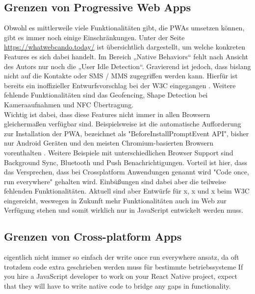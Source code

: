 \subsection{Grenzen von Progressive Web Apps}
Obwohl es mittlerweile viele Funktionalitäten gibt, die PWAs umsetzen können, gibt es immer noch einige Einschränkungen. Unter der Seite \url{https://whatwebcando.today/} ist übersichtlich dargestellt, um welche konkreten Features es sich dabei handelt. Im Bereich „Native Behaviors“ fehlt nach Ansicht des Autors nur noch die „User Idle Detection“. Gravierend ist jedoch, dass bislang nicht auf die Kontakte oder SMS / MMS zugegriffen werden kann. Hierfür ist bereits ein inoffizieller Entwurfsvorschlag bei der W3C eingegangen \cite{Beverloo.2021}. Weitere fehlende Funktionalitäten sind das Geofencing, Shape Detection bei Kameraaufnahmen und NFC Übertragung.\\
Wichtig ist dabei, dass diese Features nicht immer in allen Browsern gleichermaßen verfügbar sind. Beispielsweise ist die automatische Aufforderung zur Installation der PWA, bezeichnet als "BeforeInstallPromptEvent API", bisher nur Android Geräten und den meisten Chromium-basierten Browsern vorenthalten \cite{}. Weitere Beispiele mit unterschiedlichen Browser Support sind Background Sync, Bluetooth und Push Benachrichtigungen.
Vorteil ist hier, dass das Versprechen, dass bei Crossplatform Anwendungen genannt wird "Code once, run everywhere" gehalten wird. Einbüßungen sind dabei aber die teilweise fehlenden Funktionalitäten. Aktuell sind aber Entwürfe für x, x und x beim W3C eingereicht, weswegen in Zukunft mehr Funktionalitäten auch im Web zur Verfügung stehen und somit wirklich nur in JavaScript entwickelt werden muss.

\subsection{Grenzen von Cross-platform Apps}
eigentlich nicht immer so einfach der write once run everywhere ansatz, da oft trotzdem code extra geschrieben werden muss für bestimmte betriebssysteme
If you hire a JavaScript developer to work on your React Native project, expect that they will have to write native code to bridge any gaps in functionality.
